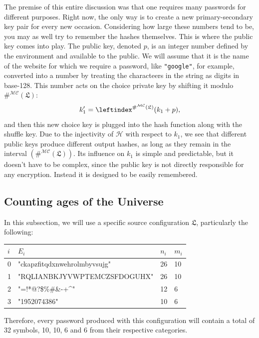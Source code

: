\documentclass[12pt, a4paper]{article}
\renewcommand{\C}{\mathcal{C}}
\renewcommand{\H}{\mathcal{H}}
\newcommand{\M}{\mathcal{M}}
\newcommand{\conf}{\mathfrak{L}}
\newcommand{\lui}[1]{\leftindex^{#1}}
\begin{document}
The premise of this entire discussion was that one requires many passwords for different purposes. Right now, the only way is to create a new primary-secondary key pair for every new occasion. Considering how large these numbers tend to be, you may as well try to remember the hashes themselves. This is where the public key comes into play. The public key, denoted $ p $, is an integer number defined by the environment and available to the public. We will assume that it is the name of the website for which we require a password, like \texttt{"google"}, for example, converted into a number by treating the characteers in the string as digits in base-128. This number acts on the choice private key by shifting it modulo $ \#^{\M\C}(\conf) $:
\[ k_1' = \lui{\#^{\M\C}(\conf)}(k_1 + p), \] 
and then this new choice key is plugged into the hash function along with the shuffle key. Due to the injectivity of $ \H $ with respect to $ k_1 $, we see that different public keys produce different output hashes, as long as they remain in the interval $ \left( \#^{\M\C}(\conf) \right) $. Its influence on $ k_1 $ is simple and predictable, but it doesn't have to be complex, since the public key is not directly responsible for any encryption. Instead it is designed to be easily remembered.

\subsection{Counting ages of the Universe}

In this subsection, we will use a specific source configuration $ \conf $, particularly the following:

\begin{center}
\def\arraystretch{1.2}
\begin{tabular}{l|l|l|l}\ttfamily
    $ i $ & $ E_i $ & $ n_i $ & $ m_i $\\
    \hline
    0 & \ttfamily"ckapzfitqdxnwehrolmbyvsujg" & 26 & 10\\
    1 & \ttfamily"RQLIANBKJYVWPTEMCZSFDOGUHX" & 26 & 10\\
    2 & \ttfamily"=!*@?\$\%\#\&-+\^{}"        & 12 & 6\\
    3 & \ttfamily"1952074386"                 & 10 & 6\\
\end{tabular}
\end{center}

Therefore, every password produced with this configuration will contain a total of 32 symbols, 10, 10, 6 and 6 from their respective categories.
\end{document}
